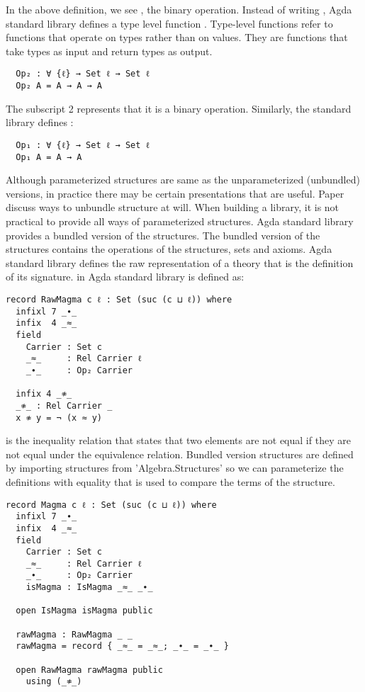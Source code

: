 In the above definition, we see , the binary operation.
Instead of writing , Agda standard library defines a type
level function . Type-level functions refer to functions that
operate on types rather than on values. They are functions that take types as
input and return types as output.

\begin{verbatim}
  Op₂ : ∀ {ℓ} → Set ℓ → Set ℓ
  Op₂ A = A → A → A
\end{verbatim}

The subscript 2 represents that it is a binary operation. Similarly, the
standard library defines :

\begin{verbatim}
  Op₁ : ∀ {ℓ} → Set ℓ → Set ℓ
  Op₁ A = A → A
\end{verbatim}

Although parameterized structures are same as the unparameterized (unbundled)
versions, in practice there may be certain presentations that are useful. Paper
\cite{al2019language} discuss ways to unbundle structure at will. When building
a library, it is not practical to provide all ways of parameterized structures.
Agda standard library provides a bundled version of the structures. The bundled
version of the structures contains the operations of the structures, sets and
axioms. Agda standard library defines the raw representation of a theory that is
the definition of its signature.  in Agda standard library is defined as:

\begin{verbatim}
record RawMagma c ℓ : Set (suc (c ⊔ ℓ)) where
  infixl 7 _∙_
  infix  4 _≈_
  field
    Carrier : Set c
    _≈_     : Rel Carrier ℓ
    _∙_     : Op₂ Carrier

  infix 4 _≉_
  _≉_ : Rel Carrier _
  x ≉ y = ¬ (x ≈ y)
\end{verbatim}

 is the inequality relation that states that two elements are not
equal  if they are not equal under the equivalence relation.
Bundled version structures are defined by importing structures from
'Algebra.Structures' so we can parameterize the definitions with equality that
is used to compare the terms of the structure.

\begin{verbatim}
record Magma c ℓ : Set (suc (c ⊔ ℓ)) where
  infixl 7 _∙_
  infix  4 _≈_
  field
    Carrier : Set c
    _≈_     : Rel Carrier ℓ
    _∙_     : Op₂ Carrier
    isMagma : IsMagma _≈_ _∙_

  open IsMagma isMagma public

  rawMagma : RawMagma _ _
  rawMagma = record { _≈_ = _≈_; _∙_ = _∙_ }

  open RawMagma rawMagma public
    using (_≉_)
\end{verbatim}

